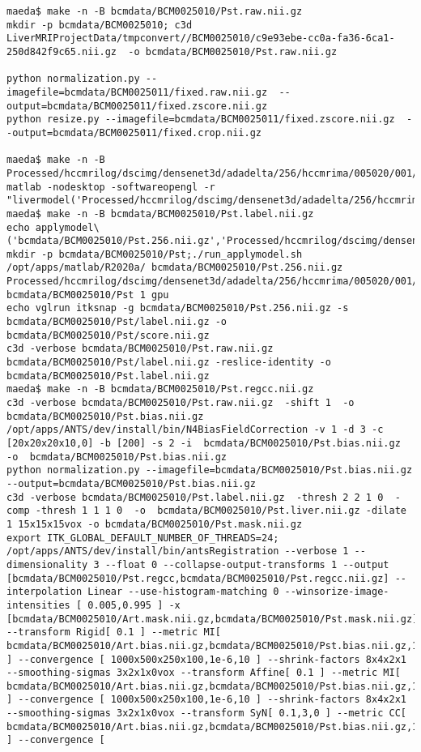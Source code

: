 \documentclass{article}         %
\theoremstyle{definition}
\theoremstyle{remark}
\begin{document}
\begin{verbatim}
maeda$ make -n -B bcmdata/BCM0025010/Pst.raw.nii.gz
mkdir -p bcmdata/BCM0025010; c3d  LiverMRIProjectData/tmpconvert//BCM0025010/c9e93ebe-cc0a-fa36-6ca1-250d842f9c65.nii.gz  -o bcmdata/BCM0025010/Pst.raw.nii.gz

python normalization.py --imagefile=bcmdata/BCM0025011/fixed.raw.nii.gz  --output=bcmdata/BCM0025011/fixed.zscore.nii.gz
python resize.py --imagefile=bcmdata/BCM0025011/fixed.zscore.nii.gz  --output=bcmdata/BCM0025011/fixed.crop.nii.gz

maeda$ make -n -B  Processed/hccmrilog/dscimg/densenet3d/adadelta/256/hccmrima/005020/001/000/trainedNet.mat
matlab -nodesktop -softwareopengl -r "livermodel('Processed/hccmrilog/dscimg/densenet3d/adadelta/256/hccmrima/005020/001/000/setup.json');exit"
maeda$ make -n -B bcmdata/BCM0025010/Pst.label.nii.gz
echo applymodel\('bcmdata/BCM0025010/Pst.256.nii.gz','Processed/hccmrilog/dscimg/densenet3d/adadelta/256/hccmrima/005020/001/000/restore_10162020/trainedNet.mat','bcmdata/BCM0025010/Pst','1','gpu'\)
mkdir -p bcmdata/BCM0025010/Pst;./run_applymodel.sh /opt/apps/matlab/R2020a/ bcmdata/BCM0025010/Pst.256.nii.gz Processed/hccmrilog/dscimg/densenet3d/adadelta/256/hccmrima/005020/001/000/restore_10162020/trainedNet.mat bcmdata/BCM0025010/Pst 1 gpu
echo vglrun itksnap -g bcmdata/BCM0025010/Pst.256.nii.gz -s bcmdata/BCM0025010/Pst/label.nii.gz -o bcmdata/BCM0025010/Pst/score.nii.gz
c3d -verbose bcmdata/BCM0025010/Pst.raw.nii.gz bcmdata/BCM0025010/Pst/label.nii.gz -reslice-identity -o bcmdata/BCM0025010/Pst.label.nii.gz
maeda$ make -n -B bcmdata/BCM0025010/Pst.regcc.nii.gz
c3d -verbose bcmdata/BCM0025010/Pst.raw.nii.gz  -shift 1  -o  bcmdata/BCM0025010/Pst.bias.nii.gz
/opt/apps/ANTS/dev/install/bin/N4BiasFieldCorrection -v 1 -d 3 -c [20x20x20x10,0] -b [200] -s 2 -i  bcmdata/BCM0025010/Pst.bias.nii.gz  -o  bcmdata/BCM0025010/Pst.bias.nii.gz
python normalization.py --imagefile=bcmdata/BCM0025010/Pst.bias.nii.gz  --output=bcmdata/BCM0025010/Pst.bias.nii.gz
c3d -verbose bcmdata/BCM0025010/Pst.label.nii.gz  -thresh 2 2 1 0  -comp -thresh 1 1 1 0  -o  bcmdata/BCM0025010/Pst.liver.nii.gz -dilate 1 15x15x15vox -o bcmdata/BCM0025010/Pst.mask.nii.gz
export ITK_GLOBAL_DEFAULT_NUMBER_OF_THREADS=24; /opt/apps/ANTS/dev/install/bin/antsRegistration --verbose 1 --dimensionality 3 --float 0 --collapse-output-transforms 1 --output [bcmdata/BCM0025010/Pst.regcc,bcmdata/BCM0025010/Pst.regcc.nii.gz] --interpolation Linear --use-histogram-matching 0 --winsorize-image-intensities [ 0.005,0.995 ] -x [bcmdata/BCM0025010/Art.mask.nii.gz,bcmdata/BCM0025010/Pst.mask.nii.gz] --transform Rigid[ 0.1 ] --metric MI[ bcmdata/BCM0025010/Art.bias.nii.gz,bcmdata/BCM0025010/Pst.bias.nii.gz,1,32,Regular,0.25 ] --convergence [ 1000x500x250x100,1e-6,10 ] --shrink-factors 8x4x2x1 --smoothing-sigmas 3x2x1x0vox --transform Affine[ 0.1 ] --metric MI[ bcmdata/BCM0025010/Art.bias.nii.gz,bcmdata/BCM0025010/Pst.bias.nii.gz,1,32,Regular,0.25 ] --convergence [ 1000x500x250x100,1e-6,10 ] --shrink-factors 8x4x2x1 --smoothing-sigmas 3x2x1x0vox --transform SyN[ 0.1,3,0 ] --metric CC[ bcmdata/BCM0025010/Art.bias.nii.gz,bcmdata/BCM0025010/Pst.bias.nii.gz,1,4 ] --convergence [

\end{verbatim}
\end{document}
